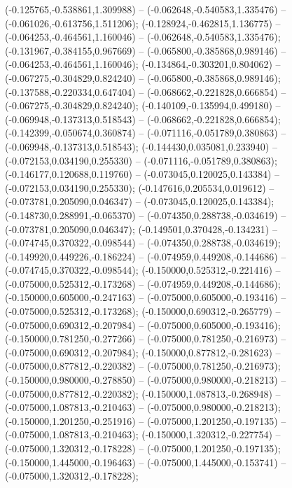  (-0.125765,-0.538861,1.309988) -- (-0.062648,-0.540583,1.335476) -- (-0.061026,-0.613756,1.511206);
 (-0.128924,-0.462815,1.136775) -- (-0.064253,-0.464561,1.160046) -- (-0.062648,-0.540583,1.335476);
 (-0.131967,-0.384155,0.967669) -- (-0.065800,-0.385868,0.989146) -- (-0.064253,-0.464561,1.160046);
 (-0.134864,-0.303201,0.804062) -- (-0.067275,-0.304829,0.824240) -- (-0.065800,-0.385868,0.989146);
 (-0.137588,-0.220334,0.647404) -- (-0.068662,-0.221828,0.666854) -- (-0.067275,-0.304829,0.824240);
 (-0.140109,-0.135994,0.499180) -- (-0.069948,-0.137313,0.518543) -- (-0.068662,-0.221828,0.666854);
 (-0.142399,-0.050674,0.360874) -- (-0.071116,-0.051789,0.380863) -- (-0.069948,-0.137313,0.518543);
 (-0.144430,0.035081,0.233940) -- (-0.072153,0.034190,0.255330) -- (-0.071116,-0.051789,0.380863);
 (-0.146177,0.120688,0.119760) -- (-0.073045,0.120025,0.143384) -- (-0.072153,0.034190,0.255330);
 (-0.147616,0.205534,0.019612) -- (-0.073781,0.205090,0.046347) -- (-0.073045,0.120025,0.143384);
 (-0.148730,0.288991,-0.065370) -- (-0.074350,0.288738,-0.034619) -- (-0.073781,0.205090,0.046347);
 (-0.149501,0.370428,-0.134231) -- (-0.074745,0.370322,-0.098544) -- (-0.074350,0.288738,-0.034619);
 (-0.149920,0.449226,-0.186224) -- (-0.074959,0.449208,-0.144686) -- (-0.074745,0.370322,-0.098544);
 (-0.150000,0.525312,-0.221416) -- (-0.075000,0.525312,-0.173268) -- (-0.074959,0.449208,-0.144686);
 (-0.150000,0.605000,-0.247163) -- (-0.075000,0.605000,-0.193416) -- (-0.075000,0.525312,-0.173268);
 (-0.150000,0.690312,-0.265779) -- (-0.075000,0.690312,-0.207984) -- (-0.075000,0.605000,-0.193416);
 (-0.150000,0.781250,-0.277266) -- (-0.075000,0.781250,-0.216973) -- (-0.075000,0.690312,-0.207984);
 (-0.150000,0.877812,-0.281623) -- (-0.075000,0.877812,-0.220382) -- (-0.075000,0.781250,-0.216973);
 (-0.150000,0.980000,-0.278850) -- (-0.075000,0.980000,-0.218213) -- (-0.075000,0.877812,-0.220382);
 (-0.150000,1.087813,-0.268948) -- (-0.075000,1.087813,-0.210463) -- (-0.075000,0.980000,-0.218213);
 (-0.150000,1.201250,-0.251916) -- (-0.075000,1.201250,-0.197135) -- (-0.075000,1.087813,-0.210463);
 (-0.150000,1.320312,-0.227754) -- (-0.075000,1.320312,-0.178228) -- (-0.075000,1.201250,-0.197135);
 (-0.150000,1.445000,-0.196463) -- (-0.075000,1.445000,-0.153741) -- (-0.075000,1.320312,-0.178228);
